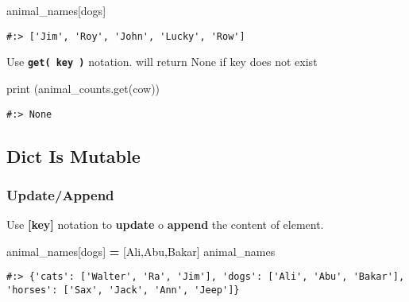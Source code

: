 \documentclass[
]{book}
\newenvironment{Shaded}{\begin{snugshade}}{\end{snugshade}}
\newcommand{\BuiltInTok}[1]{#1}
\newcommand{\NormalTok}[1]{#1}
\newcommand{\OperatorTok}[1]{\textcolor[rgb]{0.43,0.43,0.43}{\textbf{#1}}}
\newcommand{\StringTok}[1]{\textcolor[rgb]{0.5,0.5,0.5}{#1}}
\begin{document}
\begin{Shaded}
\begin{Highlighting}[]
\NormalTok{animal\_names[}\StringTok{\textquotesingle{}dogs\textquotesingle{}}\NormalTok{]}
\end{Highlighting}
\end{Shaded}

\begin{verbatim}
#:> ['Jim', 'Roy', 'John', 'Lucky', 'Row']
\end{verbatim}

Use \textbf{\texttt{get(\ key\ )}} notation. will return None if key does not exist

\begin{Shaded}
\begin{Highlighting}[]
\BuiltInTok{print}\NormalTok{ (animal\_counts.get(}\StringTok{\textquotesingle{}cow\textquotesingle{}}\NormalTok{))}
\end{Highlighting}
\end{Shaded}

\begin{verbatim}
#:> None
\end{verbatim}

\hypertarget{dict-is-mutable}{%
\subsection{Dict Is Mutable}\label{dict-is-mutable}}

\hypertarget{updateappend}{%
\subsubsection{Update/Append}\label{updateappend}}

Use \textbf{{[}key{]}} notation to \textbf{update} o \textbf{append} the content of element.

\begin{Shaded}
\begin{Highlighting}[]
\NormalTok{animal\_names[}\StringTok{\textquotesingle{}dogs\textquotesingle{}}\NormalTok{] }\OperatorTok{=}\NormalTok{ [}\StringTok{\textquotesingle{}Ali\textquotesingle{}}\NormalTok{,}\StringTok{\textquotesingle{}Abu\textquotesingle{}}\NormalTok{,}\StringTok{\textquotesingle{}Bakar\textquotesingle{}}\NormalTok{]}
\NormalTok{animal\_names}
\end{Highlighting}
\end{Shaded}

\begin{verbatim}
#:> {'cats': ['Walter', 'Ra', 'Jim'], 'dogs': ['Ali', 'Abu', 'Bakar'], 'horses': ['Sax', 'Jack', 'Ann', 'Jeep']}
\end{verbatim}
\end{document}
